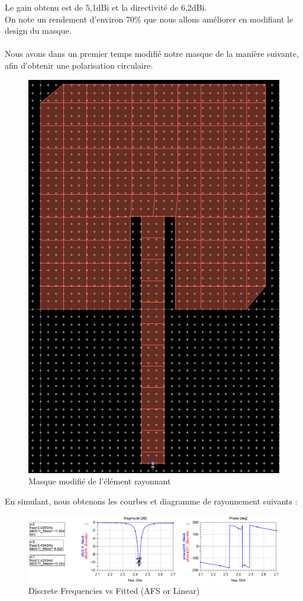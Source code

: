 \documentclass[16pt,a4paper,oneside,titlepage]{report}
\begin{document}
Le gain obtenu est de 5,1dBi et la directivité de 6,2dBi. \\
On note un rendement d'environ 70\% que nous allons améliorer en modifiant le design du masque.\\\\

\newpage
Nous avons dans un premier temps modifié notre masque de la manière suivante, afin d'obtenir une polarisation circulaire. 
\begin{figure}[h]
\center
\includegraphics[scale=0.2]{Images/P3_Q9.png}
\caption{Masque modifié de l'élément rayonnant}
\end{figure}

En simulant, nous obtenons les courbes et diagramme de rayonnement suivants :
\begin{figure}[h]
\center
\includegraphics[scale=0.4]{Images/P3_Q9-1.png}
\caption{Discrete Frequencies vs Fitted (AFS or Linear)}
\end{figure}
\end{document}

